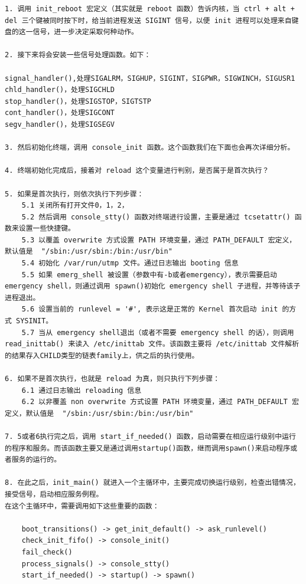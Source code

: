 {\begin{shaded}\begin{verbatim}
1. 调用 init_reboot 宏定义（其实就是 reboot 函数）告诉内核，当 ctrl + alt + del 三个键被同时按下时，给当前进程发送 SIGINT 信号，以便 init 进程可以处理来自键盘的这一信号，进一步决定采取何种动作。

2. 接下来将会安装一些信号处理函数。如下：

signal_handler(),处理SIGALRM，SIGHUP，SIGINT，SIGPWR，SIGWINCH，SIGUSR1
chld_handler()，处理SIGCHLD
stop_handler()，处理SIGSTOP，SIGTSTP
cont_handler()，处理SIGCONT
segv_handler()，处理SIGSEGV

3. 然后初始化终端，调用 console_init 函数。这个函数我们在下面也会再次详细分析。

4. 终端初始化完成后，接着对 reload 这个变量进行判别，是否属于是首次执行？ 

5. 如果是首次执行，则依次执行下列步骤：
    5.1 关闭所有打开文件0，1，2，
    5.2 然后调用 console_stty() 函数对终端进行设置，主要是通过 tcsetattr() 函数来设置一些快捷键。
    5.3 以覆盖 overwrite 方式设置 PATH 环境变量，通过 PATH_DEFAULT 宏定义，默认值是  "/sbin:/usr/sbin:/bin:/usr/bin"
    5.4 初始化 /var/run/utmp 文件。通过日志输出 booting 信息
    5.5 如果 emerg_shell 被设置（参数中有-b或者emergency），表示需要启动 emergency shell，则通过调用 spawn()初始化 emergency shell 子进程，并等待该子进程退出。
    5.6 设置当前的 runlevel = '#', 表示这是正常的 Kernel 首次启动 init 的方式 SYSINIT。
    5.7 当从 emergency shell退出（或者不需要 emergency shell 的话），则调用 read_inittab() 来读入 /etc/inittab 文件。该函数主要将 /etc/inittab 文件解析的结果存入CHILD类型的链表family上，供之后的执行使用。

6. 如果不是首次执行，也就是 reload 为真，则只执行下列步骤：
    6.1 通过日志输出 reloading 信息
    6.2 以非覆盖 non overwrite 方式设置 PATH 环境变量，通过 PATH_DEFAULT 宏定义，默认值是  "/sbin:/usr/sbin:/bin:/usr/bin"

7. 5或者6执行完之后，调用 start_if_needed() 函数，启动需要在相应运行级别中运行的程序和服务。而该函数主要又是通过调用startup()函数，继而调用spawn()来启动程序或者服务的运行的。

8. 在此之后，init_main() 就进入一个主循环中，主要完成切换运行级别，检查出错情况，接受信号，启动相应服务例程。
在这个主循环中，需要调用如下这些重要的函数：

    boot_transitions() -> get_init_default() -> ask_runlevel()
    check_init_fifo() -> console_init()
    fail_check()
    process_signals() -> console_stty()
    start_if_needed() -> startup() -> spawn()
\end{verbatim}\end{shaded}}
